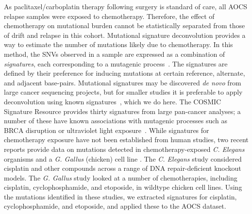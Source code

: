 As paclitaxel/carboplatin therapy following surgery is standard of care, all AOCS relapse samples were exposed to chemotherapy. Therefore, the effect of chemotherapy on mutational burden cannot be statistically separated from those of drift and relapse in this cohort. Mutational signature deconvolution provides a way to estimate the number of mutations likely due to chemotherapy. In this method, the SNVs observed in a sample are expressed as a combination of \textit{signatures}, each corresponding to a mutagenic process~\cite{Alexandrov2013}. The signatures are defined by their preference for inducing mutations at certain reference, alternate, and adjacent base-pairs. Mutational signatures may be discovered \textit{de novo} from large cancer sequencing projects, but for smaller studies it is preferable to apply deconvolution using known signatures~\cite{Rosenthal_2016}, which we do here. The COSMIC Signature Resource provides thirty signatures from large pan-cancer analyses; a number of these have known associations with mutagenic processes such as BRCA disruption or ultraviolet light exposure~\cite{364242}. While signatures for chemotherapy exposure have not been established from human studies, two recent reports provide data on mutations detected in chemotherapy-exposed \textit{C. Elegans} organisms\cite{Meier_2014} and a \textit{G. Gallus} (chicken) cell line \cite{Szikriszt_2016}. The \textit{C. Elegans} study considered cisplatin and other compounds across a range of DNA repair-deficient knockout models. The \textit{G. Gallus} study looked at a number of chemotherapies, including cisplatin, cyclophosphamide, and etoposide, in wildtype chicken cell lines. Using the mutations identified in these studies, we extracted signatures for cisplatin, cyclophosphamide, and etoposide, and applied these to the AOCS dataset.